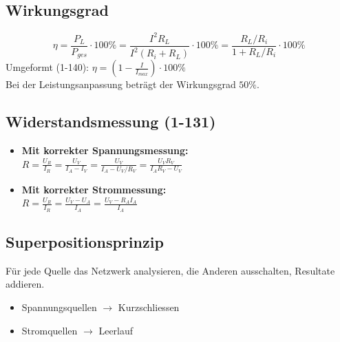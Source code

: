\documentclass[a4paper, 11pt]{scrartcl}
\begin{document}
\begin{multicols*}{2}
				\subsection{Wirkungsgrad}
				$$\eta=\frac{P_L}{P_{ges}}\cdot 100\%=\frac{I^2R_L}{I^2(R_i+R_L)}\cdot 100\%=\frac{R_L/R_i}{1+R_L/R_i}\cdot 100\%$$
				Umgeformt (1-140): $\eta=\left(1-\frac{I}{I_{max}}\right)\cdot 100\%$\\

				Bei der Leistungsanpassung beträgt der Wirkungsgrad $50\%$.\\
				\subsection{Widerstandsmessung (1-131)}
				\begin{itemize}
					\item \textbf{Mit korrekter Spannungsmessung:}\\
					$R=\frac{U_R}{I_R}=\frac{U_V}{I_A-I_V}=\frac{U_V}{I_A-U_V/R_V}=\frac{U_VR_V}{I_AR_V-U_V}$
					\item \textbf{Mit korrekter Strommessung:}\\
					$R=\frac{U_R}{I_R}=\frac{U_V-U_A}{I_A}=\frac{U_V-R_AI_A}{I_A}$
				\end{itemize}

				\subsection{Superpositionsprinzip}
				Für jede Quelle das Netzwerk analysieren, die Anderen ausschalten, Resultate addieren.
				\begin{itemize}
					\item Spannungsquellen $\rightarrow$ Kurzschliessen
					\item Stromquellen $\rightarrow$ Leerlauf
				\end{itemize}				


		\end{multicols*}

\setcounter{secnumdepth}{2}
\end{document}
